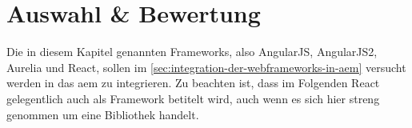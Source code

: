 \section{Auswahl \& Bewertung}
\label{sec:auswahl-und-bewertung}

Die in diesem Kapitel genannten Frameworks, also AngularJS, AngularJS2, Aurelia und React, sollen im \autoref{sec:integration-der-webframeworks-in-aem} versucht werden in das \ac{aem} zu integrieren. Zu beachten ist, dass im Folgenden React gelegentlich auch als Framework betitelt wird, auch wenn es sich hier streng genommen um eine Bibliothek handelt. \\







